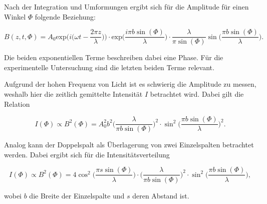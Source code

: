 Nach der Integration und Umformungen ergibt sich für die Amplitude für einen Winkel $\Phi$ folgende Beziehung:

\begin{equation}
    \label{eqn:amp-integration}
    B(z, t, \Phi) = A_0 \text{exp} \bigg( i \bigg( \omega t - \frac{2 \pi z}{\lambda} \bigg) \bigg) \cdot \text{exp} \bigg( \frac{i \pi b \sin (\Phi)}{\lambda} \bigg) \cdot \frac{\lambda}{\pi \sin( \Phi )} \sin \bigg( \frac{\pi b \sin(\Phi )}{\lambda} \bigg).
\end{equation}

Die beiden exponentiellen Terme beschreiben dabei eine Phase. Für die experimentelle Untersuchung sind die letzten beiden Terme relevant.

Aufgrund der hohen Frequenz von Licht ist es schwierig die Amplitude zu messen, weshalb hier die zeitlich gemittelte Intensität $I$ betrachtet wird. Dabei gilt die Relation

\begin{equation}
    \label{eqn:intensitaet-einzel}
    I ( \Phi ) \propto B^2 ( \Phi ) = A_0^2 b^2 \bigg( \frac{\lambda}{\pi b \sin ( \Phi )} \bigg)^2 \cdot \sin^2 \bigg( \frac{\pi b \sin(\Phi)}{\lambda} \bigg)^2.
\end{equation}

Analog kann der Doppelspalt als Überlagerung von zwei Einzelspalten betrachtet werden.
Dabei ergibt sich für die Intensitätsverteilung

\begin{equation}
    \label{eqn:intensitaet-doppel}
    I ( \Phi ) \propto B^2 (\Phi ) = 4 \cos^2 \bigg ( \frac{\pi s \sin( \Phi )}{\lambda} \bigg) \cdot \bigg( \frac{\lambda}{\pi b \sin( \Phi )} \bigg)^2 \cdot \sin^2 \bigg( \frac{\pi b \sin ( \Phi )}{\lambda} \bigg),
\end{equation}

wobei $b$ die Breite der Einzelspalte und $s$ deren Abstand ist.
